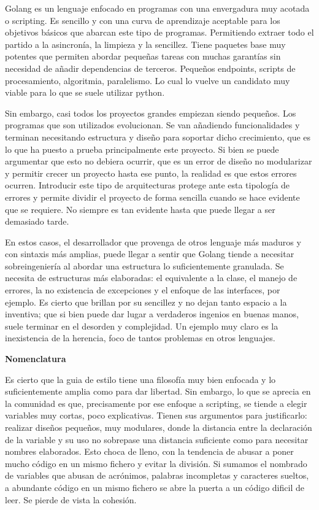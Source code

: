 
Golang es un lenguaje enfocado en programas con una envergadura muy acotada o scripting. Es sencillo y con una curva de aprendizaje aceptable para los objetivos básicos que abarcan este tipo de programas. Permitiendo extraer todo el partido a la asincronía, la limpieza y la sencillez. Tiene paquetes base muy potentes que permiten abordar pequeñas tareas con muchas garantías sin necesidad de añadir dependencias de terceros. Pequeños endpoints, scripts de procesamiento, algoritmia, paralelismo. Lo cual lo vuelve un candidato muy viable para lo que se suele utilizar python.

Sin embargo, casi todos los proyectos grandes empiezan siendo pequeños. Los programas que son utilizados evolucionan. Se van añadiendo funcionalidades y terminan necesitando estructura y diseño para soportar dicho crecimiento, que es lo que ha puesto a prueba principalmente este proyecto. Si bien se puede argumentar que esto no debiera ocurrir, que es un error de diseño no modularizar y permitir crecer un proyecto hasta ese punto, la realidad es que estos errores ocurren. Introducir este tipo de arquitecturas protege ante esta tipología de errores y permite dividir el proyecto de forma sencilla cuando se hace evidente que se requiere. No siempre es tan evidente hasta que puede llegar a ser demasiado tarde.

En estos casos, el desarrollador que provenga de otros lenguaje más maduros y con sintaxis más amplias, puede llegar a sentir que Golang tiende a necesitar sobreingeniería al abordar una estructura lo suficientemente granulada. Se necesita de estructuras más elaboradas: el equivalente a la clase, el manejo de errores, la no existencia de excepciones y el enfoque de las interfaces, por ejemplo. Es cierto que brillan por su sencillez y no dejan tanto espacio a la inventiva; que si bien puede dar lugar a verdaderos ingenios en buenas manos, suele terminar en el desorden y complejidad. Un ejemplo muy claro es la inexistencia de la herencia, foco de tantos problemas en otros lenguajes.

\textbf{Nomenclatura}

Es cierto que la guia de estilo tiene una filosofía muy bien enfocada y lo suficientemente amplia como para dar libertad. Sin embargo, lo que se aprecia en la comunidad es que, precisamente por ese enfoque a scripting, se tiende a elegir variables muy cortas, poco explicativas. Tienen sus argumentos para justificarlo: realizar diseños pequeños, muy modulares, donde la distancia entre la declaración de la variable y su uso no sobrepase una distancia suficiente como para necesitar nombres elaborados. Esto choca de lleno, con la tendencia de abusar a poner mucho código en un mismo fichero y evitar la división. Si sumamos el nombrado de variables que abusan de acrónimos, palabras incompletas y caracteres sueltos, a abundante código en un mismo fichero se abre la puerta a un código dificil de leer. Se pierde de vista la cohesión.

